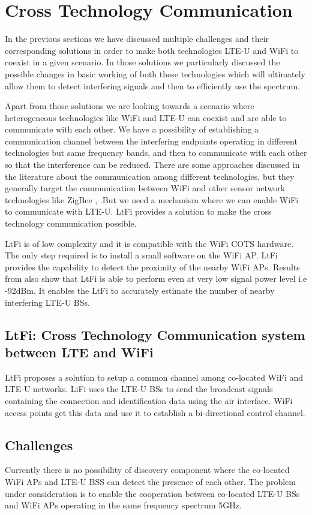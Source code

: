 \documentclass{IEEEtran}
\begin{document}
\section{Cross Technology Communication}
In the previous sections we have discussed multiple challenges and their corresponding solutions in order to make both technologies LTE-U and WiFi to coexist in a given scenario. In those solutions we particularly discussed the possible changes in basic working of both these technologies which will ultimately allow them to detect interfering signals and then to efficiently use the spectrum.

Apart from those solutions we are looking towards a scenario where heterogeneous technologies like WiFi and LTE-U can coexist and are able to communicate with each other. We have a possibility of establishing a communication channel between the interfering endpoints operating in different technologies but same frequency bands, and then to communicate with each other so that the interference can be reduced. There are some approaches discussed in the literature about the communication among different technologies, but they generally target the communication between WiFi and other sensor network technologies like ZigBee \cite{Wang2019}, \cite{Yin2017}.But we need a mechanism where we can enable WiFi to communicate with LTE-U. LtFi \cite{Gawowicz2017} provides a solution to make the cross technology communication possible.

LtFi is of low complexity and it is compatible with the WiFi COTS hardware. The only step required is to install a small software on the WiFi AP. LtFi provides the capability to detect the proximity of the nearby WiFi APs. Results from \cite{Gawowicz2017} also show that LtFi is able to perform even at very low signal power level i.e -92dBm. It enables the LtFi to accurately estimate the number of nearby interfering LTE-U BSs.

\subsection{LtFi: Cross Technology Communication system between LTE and WiFi}
LtFi proposes a solution to setup a common channel among co-located WiFi and LTE-U networks. LiFi uses the LTE-U BSs to send the broadcast signals containing the connection and identification data using the air interface. WiFi access points get this data and use it to establish a bi-directional control channel.

\subsection{Challenges}
Currently there is no possibility of discovery component where the co-located WiFi APs and LTE-U BSS can detect the presence of each other. The problem under consideration is to enable the cooperation between co-located LTE-U BSs and WiFi APs operating in the same frequency spectrum 5GHz.
\end{document}
